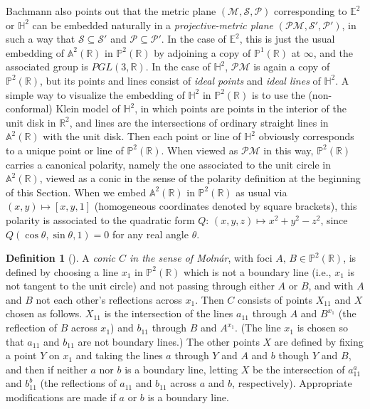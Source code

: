 \documentclass[12pt]{amsart}
\theoremstyle{definition}
\newtheorem{definition}[theorem]{Definition}
\begin{document}
Bachmann also points out that the metric plane $({\mathcal M},
{\mathcal S}, {\mathcal P})$ corresponding to ${\mathbb E}^2$ or ${\mathbb H}^2$ can be embedded naturally in a
\emph{projective-metric plane} $({\mathcal P}{\mathcal M}, {\mathcal S}', {\mathcal P}')$, in such a way
that ${\mathcal S}\subseteq {\mathcal S}'$ and ${\mathcal P}\subseteq {\mathcal P}'$.
In the case of ${\mathbb E}^2$, this is just the usual embedding of
${\mathbb A}^2({\mathbb R})$ in ${\mathbb P}^2({\mathbb R})$ by adjoining a copy of ${\mathbb P}^1({\mathbb R})$ at
$\infty$, and the associated group is $PGL(3,{\mathbb R})$.  In the case of
${\mathbb H}^2$, ${\mathcal P}{\mathcal M}$ is again a copy of ${\mathbb P}^2({\mathbb R})$, but its points 
and lines consist of \emph{ideal points} and \emph{ideal lines} of
${\mathbb H}^2$. A simple way to visualize the embedding of ${\mathbb H}^2$ in
${\mathbb P}^2({\mathbb R})$ is to use the (non-conformal) Klein model of ${\mathbb H}^2$, in
which points are points in the interior of the unit disk in ${\mathbb R}^2$,
and lines are the intersections of ordinary straight lines in
${\mathbb A}^2({\mathbb R})$ with the unit disk.  Then each point or line of ${\mathbb H}^2$
obviously corresponds to a unique point or line of ${\mathbb P}^2({\mathbb R})$.
When viewed as ${\mathcal P}{\mathcal M}$ in this way, ${\mathbb P}^2({\mathbb R})$ carries a canonical
polarity, namely the one associated to the unit circle in
${\mathbb A}^2({\mathbb R})$, viewed as a conic in the sense of the polarity
definition at the beginning of this Section.  When we embed
${\mathbb A}^2({\mathbb R})$ in ${\mathbb P}^2({\mathbb R})$ as usual via $(x,y)\mapsto [x,y,1]$
(homogeneous coordinates denoted by square brackets), this polarity is
associated to the quadratic form $Q{\colon\,} (x,y,z)\mapsto x^2+y^2-z^2$, since
$Q(\cos\theta,\sin\theta,1)=0$ for any real angle $\theta$.
\begin{definition}[{\cite[Definition 4.1]{MR487028}}]
\label{def:Molnar}
A \emph{conic $C$ in the sense of Moln\'ar}, with foci $A,\,B\in
{\mathbb P}^2({\mathbb R})$, is defined by choosing a line $x_1$ in ${\mathbb P}^2({\mathbb R})$ which is not a
boundary line (i.e., $x_1$ is not tangent to the unit circle) and not
passing through either $A$ or $B$, and with $A$ and $B$ not each
other's reflections across $x_1$.  Then $C$ consists of points $X_{11}$
and $X$ chosen as follows.  $X_{11}$ is the intersection of the lines
$a_{11}$ through $A$ and $B^{x_1}$ (the reflection of $B$ across
$x_1$) and $b_{11}$ through $B$ and $A^{x_1}$. (The line $x_1$ is
chosen so that $a_{11}$ and $b_{11}$ are not boundary lines.) The other
points $X$ are defined by fixing a point $Y$ on $x_1$ and
taking the lines $a$ through $Y$ and $A$ and $b$ though $Y$ and $B$,
and then if neither $a$ nor $b$ is a boundary line, letting $X$ be the
intersection of $a_{11}^a$ and $b_{11}^b$ (the reflections of $a_{11}$
and $b_{11}$ across $a$ and $b$, respectively).  Appropriate
modifications are made if $a$ or $b$ is a boundary line.
\end{definition}
\end{document}
